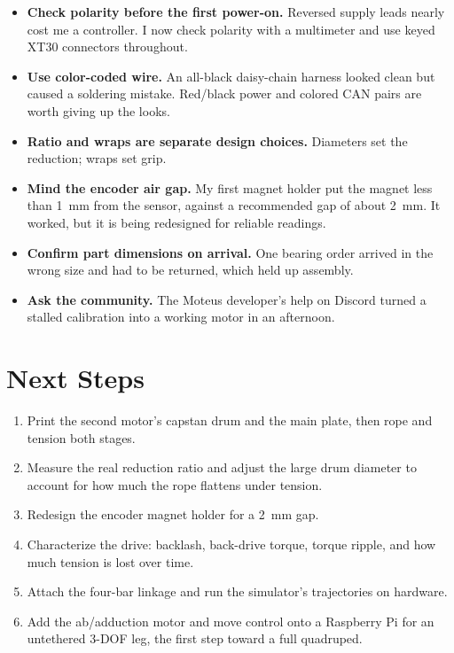 \documentclass[11pt]{article}
\begin{document}
\begin{itemize}
  \item \textbf{Check polarity before the first power-on.} Reversed supply leads
        nearly cost me a controller. I now check polarity with a multimeter and
        use keyed XT30 connectors throughout.
  \item \textbf{Use color-coded wire.} An all-black daisy-chain harness looked
        clean but caused a soldering mistake. Red/black power and colored CAN
        pairs are worth giving up the looks.
  \item \textbf{Ratio and wraps are separate design choices.} Diameters set the
        reduction; wraps set grip.
  \item \textbf{Mind the encoder air gap.} My first magnet holder put the magnet
        less than \SI{1}{\milli\metre} from the sensor, against a recommended
        gap of about \SI{2}{\milli\metre}. It worked, but it is being redesigned
        for reliable readings.
  \item \textbf{Confirm part dimensions on arrival.} One bearing order arrived
        in the wrong size and had to be returned, which held up assembly.
  \item \textbf{Ask the community.} The Moteus developer's help on Discord
        turned a stalled calibration into a working motor in an afternoon.
\end{itemize}

\section{Next Steps}

\begin{enumerate}
  \item Print the second motor's capstan drum and the main plate, then rope and
        tension both stages.
  \item Measure the real reduction ratio and adjust the large drum diameter to
        account for how much the rope flattens under tension.
  \item Redesign the encoder magnet holder for a \SI{2}{\milli\metre} gap.
  \item Characterize the drive: backlash, back-drive torque, torque ripple, and
        how much tension is lost over time.
  \item Attach the four-bar linkage and run the simulator's trajectories on
        hardware.
  \item Add the ab/adduction motor and move control onto a Raspberry Pi for an
        untethered 3-DOF leg, the first step toward a full quadruped.
\end{enumerate}
\end{document}
